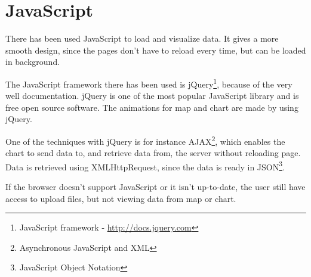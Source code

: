 \chapter{JavaScript}
There has been used JavaScript to load and visualize data. It gives a more smooth design, since the pages don't have to reload every time, but can be loaded in background.

The JavaScript framework there has been used is jQuery\footnote{JavaScript framework - \url{http://docs.jquery.com}}, because of the very well documentation. jQuery is one of the most popular JavaScript library and is free open source software. The animations for map and chart are made by using jQuery.
 
One of the techniques with jQuery is for instance AJAX\footnote{Asynchronous JavaScript and XML}, which enables the chart to send data to, and retrieve data from, the server without reloading page. Data is retrieved using XMLHttpRequest, since the data is ready in JSON\footnote{JavaScript Object Notation}.

If the browser doesn't support JavaScript or it isn't up-to-date, the user still have access to upload files, but not viewing data from map or chart.
